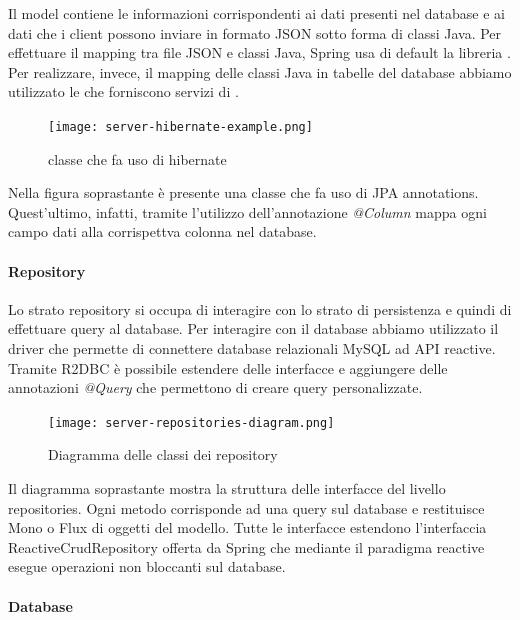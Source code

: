 \documentclass[../manuale-manutentore.tex]{subfiles}
\begin{document}
Il model contiene le informazioni corrispondenti ai dati presenti nel database e ai dati che i client possono inviare in formato JSON sotto forma di classi Java.
Per effettuare il mapping tra file JSON e classi Java, Spring usa di default la libreria .
Per realizzare, invece, il mapping delle classi Java in tabelle del database abbiamo utilizzato le  che forniscono servizi di .

\begin{figure}[H]
  \centering
  \texttt{[image: server-hibernate-example.png]}
  \caption{classe che fa uso di hibernate}%
   \label{fig:classe che fa uso di hibernate}
\end{figure}

Nella figura soprastante è presente una classe che fa uso di JPA annotations.
Quest'ultimo, infatti, tramite l'utilizzo dell'annotazione \textit{@Column} mappa ogni campo dati alla corrispettva colonna nel database.


\paragraph{Repository}%
\label{par:repository}

Lo strato repository si occupa di interagire con lo strato di persistenza e quindi di effettuare query al database.
Per interagire con il database abbiamo utilizzato il driver  che permette di connettere database relazionali MySQL ad API reactive.
Tramite R2DBC è possibile estendere delle interfacce e aggiungere delle annotazioni \textit{@Query} che permettono di creare query personalizzate.

\begin{figure}[H]
  \centering
  \texttt{[image: server-repositories-diagram.png]}
  \caption{Diagramma delle classi dei repository}%
   \label{fig:diagramma delle classi dei repository}
\end{figure}

Il diagramma soprastante mostra la struttura delle interfacce del livello repositories.
Ogni metodo corrisponde ad una query sul database e restituisce Mono o Flux di oggetti del modello.
Tutte le interfacce estendono l'interfaccia ReactiveCrudRepository offerta da Spring che mediante il paradigma reactive esegue operazioni non bloccanti sul database.

\paragraph{Database}%
\label{par:database}
\end{document}
